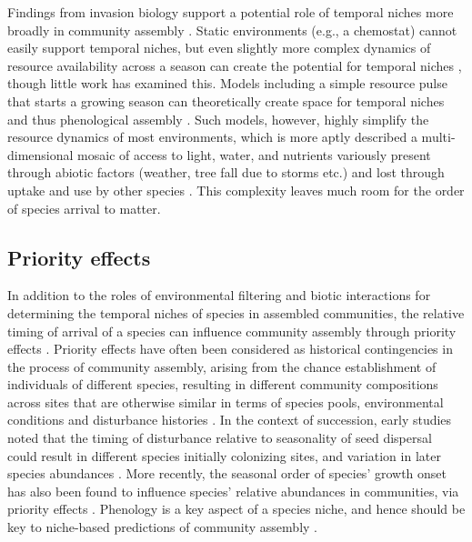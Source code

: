 \documentclass[11pt]{article}
\newcommand{\R}[1]{\label{}\linelabel{#1}}
\begin{document}
Findings from invasion biology support a potential role of temporal niches more broadly in community assembly \citep{gotelli1996}. Static environments (e.g., a chemostat) cannot easily support temporal niches, but even slightly more complex dynamics of resource availability across a season can create the potential for temporal niches\R{morefsS} \citep[Fig. \ref{fig:resource}, and see][]{Chesson:2004eo}, \R{notincluded1S}though little work has examined this\R{notincluded1E}. Models including a simple resource pulse that starts a growing season can theoretically create space for temporal niches and thus phenological assembly \citep[discussed further in the section on coexistence, and see][]{wolkovich2021phenological}. Such models, however, highly simplify the resource dynamics of most environments, which is more aptly described a multi-dimensional mosaic of access to light, water, and nutrients variously present through abiotic factors (weather, tree fall due to storms etc.) and lost through uptake and use by other species \citep{craine2013mechanisms}. \R{morefsE}This complexity leaves much room for the order of species arrival to matter.

\subsection*{Priority effects}

In addition to the roles of environmental filtering and biotic interactions for determining the temporal niches of species in assembled communities, the relative timing of arrival of a species can influence community assembly through priority effects \citep{alford1985priority,chase2003community,fukami2015historical}. Priority effects have often been considered as historical contingencies in the process of community assembly, arising from the chance establishment of individuals of different species, resulting in different community compositions across sites that are otherwise similar in terms of species pools, environmental conditions and disturbance histories \citep[e.g.][]{diamond1975assembly}. In the context of succession, early studies noted that the timing of disturbance relative to seasonality of seed dispersal could result in different species initially colonizing sites, and variation in later species abundances \citep{keever1950causes,holt1972effect}. More recently, the seasonal order of species’ growth onset has also been found to influence species' relative abundances in communities, via priority effects \citep{fukami2015historical,wainwright2012seasonal,rudolf2019role}.  Phenology is a key aspect of a species niche, and hence should be key to niche-based predictions of community assembly \citep{vannette2014historical}.
\end{document}
